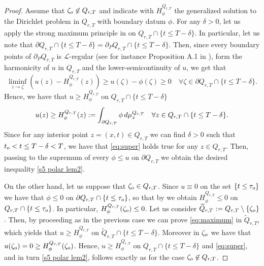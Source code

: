 \documentclass{amsart}
\numberwithin{equation}{section}
\def \p{{\phi}}
\def \Lc{{\mathcal{L}}}
\begin{document}
{\begin{proof}
Assume that $\zeta_{\rm o} \not \in {Q}_{r,T}$ and indicate with $H^{{Q}_{r,T}}_\p$ the generalized solution to the Dirichlet problem in ${Q}_{r,T}$ with boundary datum $\p$. { For any $\delta>0$, let us apply the strong maximum principle in {\cite[Proposition 3.1]{LU10}} on $Q_{r,T} \cap \{t \leq T -\delta\}$. In particular, let us note that $\partial {Q}_{r,T} \cap \{t \leq T-\delta\} = \partial_P {Q}_{r,T} \cap \{t \leq T-\delta\}$. 
Then, since every boundary points of $\partial_P Q_{r,T}$ is $\Lc$-regular (see for instance Proposition A.1 in \cite{Mon96}),} form the harmonicity of $u$ in ${Q}_{r,T}$ and the lower-semicontinuity of $u$, we get that
\begin{equation}\label{eq:maximum}
\liminf_{z \rightarrow \zeta}(u(z)-H^{{Q}_{r,T}}_\p(z)) \geq u(\zeta) -\p(\zeta) \geq 0 \quad {\forall \zeta \in \partial {Q}_{r,T} \cap \{t \leq T -\delta\}}.
\end{equation}
{Hence, \cite[Proposition 3.10]{LU10} we have that $u \geq H^{{Q}_{r,T}}_\p$ on ${Q}_{r,T} \cap \{t \leq T -\delta\}$
\begin{equation}\label{eq:super}
u(z) \geq H^{{Q}_{r,T}}_\p(z) := \int_{\partial{Q}_{r,T}} \p \, {\rm d}\mu^{{Q}_{r,T}}_z \quad \forall z \in  {Q}_{r,T} \cap \{t \leq T -\delta\}.
\end{equation}
Since for any interior point $z= (x,t) \in {Q}_{r,T}$ we can find $\delta>0$ such that $t_{\rm o} < t \leq T -\delta < T$, we have that \eqref{eq:super} holds true for any $z \in {Q}_{r,T}$. Then,} passing to the supremum of every $\p \leq u$ on $ \partial {Q}_{r,T}$ we obtain the desired inequality \eqref{s5 polar lem2}.

On the other hand, let us suppose that $\zeta_{\rm o} \in {Q}_{r,T}$. Since $u \equiv 0$ on the set $\{t \leq \tau_{\rm o}\}$ we have that $\p \leq 0 $ on $\partial {Q}_{r,T} \cap \{t \leq \tau_{\rm o}\}$, { so that by  \cite[Proposition 3.10]{LU10} 
	we obtain $H^{{Q}_{r,T}}_\p \leq 0$ on ${Q}_{r,T} \cap \{t \leq \tau_{\rm o}\}$. In particular,}
$H^{{Q}_{r,T}}_\p(\zeta_{\rm o}) \leq 0$. Let us consider $\widetilde{Q}_{r,T}:= {Q}_{r,T} \setminus \{\zeta_{\rm o}\}$. 
{Then, by proceeding as in the previous case we can prove \eqref{eq:maximum} in $\widetilde{Q}_{r,T}$, which yields that }
$u \geq H^{{Q}_{r,T}}_\p$ on {$\widetilde{Q}_{r,T} \cap \{t \leq T-\delta\}$}. Moreover in $\zeta_{\rm o}$ we have that $u(\zeta_{\rm o}) =0 \geq H^{{Q}_{r,T}}_\p(\zeta_{\rm o})$. Hence, $u \geq H^{{Q}_{r,T}}_\p$ on {${Q}_{r,T} \cap \{t \leq T-\delta\}$} and {\eqref{eq:super}, and in turn} \eqref{s5 polar lem2}, follows exactly as for the case $\zeta_{\rm o} \not \in {Q}_{r,T}$.
\end{proof}

}
\end{document}

